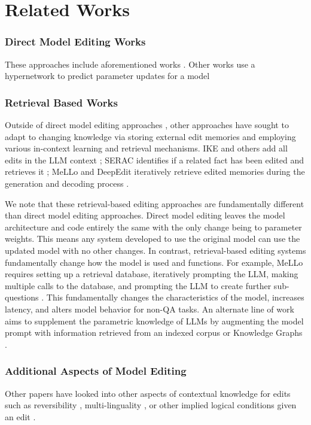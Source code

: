\section{Related Works}
\subsubsection{Direct Model Editing Works} These approaches include aforementioned works \cite{ftZhu2020ModifyingMI, mendMitchell2021FastME, memitMeng2022MassEditingMI, romeMeng2022LocatingAE}. Other works use a hypernetwork to predict parameter updates for a model \citet{DeCao2021EditingFK} 

\subsubsection{Retrieval Based Works} Outside of direct model editing approaches \citep{ftZhu2020ModifyingMI, romeMeng2022LocatingAE, mendMitchell2021FastME, memitMeng2022MassEditingMI, birdMa2023UntyingTR}, other approaches have sought to adapt to changing knowledge via storing external edit memories and employing various in-context learning and retrieval mechanisms. IKE and others add all edits in the LLM context \citep{ikeZheng2023CanWE, Onoe2023CanLL}; SERAC identifies if a related fact has been edited and retrieves it \citep{seracMitchell2022MemoryBasedME}; MeLLo and DeepEdit iteratively retrieve edited memories during the generation and decoding process \citep{Zhong2023MQuAKEAK, Wang2024DeepEditKE}. 
    
We note that these retrieval-based editing approaches are fundamentally different than direct model editing approaches. Direct model editing leaves the model architecture and code entirely the same with the only change being to parameter weights. This means any system developed to use the original model can use the updated model with no other changes. In contrast, retrieval-based editing systems fundamentally change how the model is used and functions. For example, MeLLo requires setting up a retrieval database, iteratively prompting the LLM, making multiple calls to the database, and prompting the LLM to create further sub-questions \cite{Zhong2023MQuAKEAK}. This fundamentally changes the characteristics of the model, increases latency, and alters model behavior for non-QA tasks. An alternate line of work aims to supplement the parametric knowledge of LLMs by augmenting the model prompt with information retrieved from an indexed corpus \cite{lewis2020retrieval} or Knowledge Graphs \cite{markowitz-etal-2024-tree}. 

\subsubsection{Additional Aspects of Model Editing} Other papers have looked into other aspects of contextual knowledge for edits such as reversibility \citep{birdMa2023UntyingTR}, multi-linguality \citep{Wang2023RetrievalaugmentedMK, Si2024MPNLM}, or other implied logical conditions given an edit \citep{easyeditWang2023EasyEditAE, rippleCohen2023EvaluatingTR, depeditLi2023EvaluatingDI}.